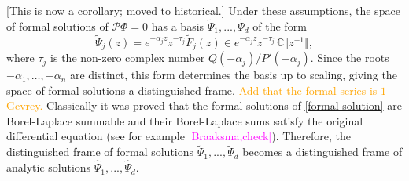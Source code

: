\documentclass{article}
\newcommand{\C}{\mathbb{C}}
\newcommand{\series}[1]{\tilde{#1}}
\theoremstyle{definition}
\theoremstyle{plain}
\begin{document}
\color{gray}
[This is now a corollary; moved to historical.] Under these assumptions, the space of formal solutions of $\mathcal{P}\Phi = 0$ has a basis $\series{\Psi}_1,...,\series{\Psi}_d$ of the form~\cite{int-irreg}\cite[Proposition~2.2.7, p.~111]{EcalleIII}
\begin{equation}\label{formal solution}
\series{\Psi}_j(z)=e^{-\alpha_j z}z^{-\tau_j}\series{F}_j(z)\in e^{-\alpha_j z } z^{-\tau_j}\,\C \llbracket z^{-1} \rrbracket,
\end{equation}
where $\tau_j$ is the non-zero complex number $Q(-\alpha_j)/P'(-\alpha_j)$. Since the roots $-\alpha_1, \ldots, -\alpha_n$ are distinct, this form determines the basis up to scaling, giving the space of formal solutions a distinguished frame. \textcolor{orange}{Add that the formal series is $1$-Gevrey.} Classically it was proved that the formal solutions of \eqref{formal solution} are Borel-Laplace summable and their Borel-Laplace sums satisfy the original differential equation (see for example \cite{ramis1991series,malgrange92,malgrange1995sommation,diverg-resurg--ii}\textcolor{magenta}{[Braaksma,check]}). Therefore, the distinguished frame of formal solutions $\series{\Psi}_1,...,\series{\Psi}_d$ becomes a distinguished frame of analytic solutions $\hat{\Psi}_1,...,\hat{\Psi}_d$.       
\end{document}
